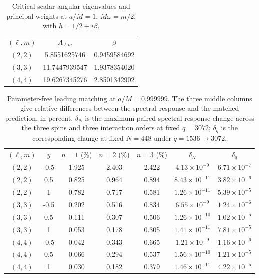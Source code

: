 \begin{table}[t]
\caption{Critical scalar angular eigenvalues and principal weights at
$a/M=1$, $M\omega=m/2$, with $h=1/2+i\beta$.}
\label{tab:principal-weights20261014}
\begin{ruledtabular}\begin{tabular}{ccc}
$(\ell,m)$ & $A_{\ell m}$ & $\beta$\\
$(2,2)$ & 5.8551625746 & 0.9459584692 \\
$(3,3)$ & 11.7447939547 & 1.9378354020 \\
$(4,4)$ & 19.6267345276 & 2.8501342902 \\
\end{tabular}\end{ruledtabular}\end{table}
\begin{table}[t]
\caption{Parameter-free leading matching at $a/M=0.999999$.
The three middle columns give relative differences between the spectral
response and the matched prediction, in percent.  $\delta_N$ is the maximum
paired spectral response change across the three spins and three interaction
orders at fixed $q=3072$; $\delta_q$ is the corresponding change at fixed
$N=448$ under $q=1536\to3072$.}
\label{tab:principal-verification20261014}
\begin{ruledtabular}\begin{tabular}{ccccccc}
$(\ell,m)$ & $y$ & $n=1$ (\%) & $n=2$ (\%) & $n=3$ (\%) & $\delta_N$ & $\delta_q$\\
$(2,2)$ & -0.5 & 1.925 & 2.403 & 2.422 & $4.13\times10^{-9}$ & $6.71\times10^{-7}$\\
$(2,2)$ & 0.5 & 0.825 & 0.964 & 0.894 & $8.43\times10^{-11}$ & $3.82\times10^{-6}$\\
$(2,2)$ & 1 & 0.782 & 0.717 & 0.581 & $1.26\times10^{-11}$ & $5.39\times10^{-5}$\\
$(3,3)$ & -0.5 & 0.202 & 0.516 & 0.834 & $6.55\times10^{-9}$ & $1.24\times10^{-6}$\\
$(3,3)$ & 0.5 & 0.111 & 0.307 & 0.506 & $1.26\times10^{-10}$ & $1.02\times10^{-5}$\\
$(3,3)$ & 1 & 0.053 & 0.178 & 0.305 & $1.41\times10^{-11}$ & $7.81\times10^{-5}$\\
$(4,4)$ & -0.5 & 0.042 & 0.343 & 0.665 & $1.21\times10^{-9}$ & $1.16\times10^{-6}$\\
$(4,4)$ & 0.5 & 0.066 & 0.294 & 0.537 & $1.56\times10^{-10}$ & $1.21\times10^{-5}$\\
$(4,4)$ & 1 & 0.030 & 0.182 & 0.379 & $1.46\times10^{-11}$ & $4.22\times10^{-5}$\\
\end{tabular}\end{ruledtabular}\end{table}

